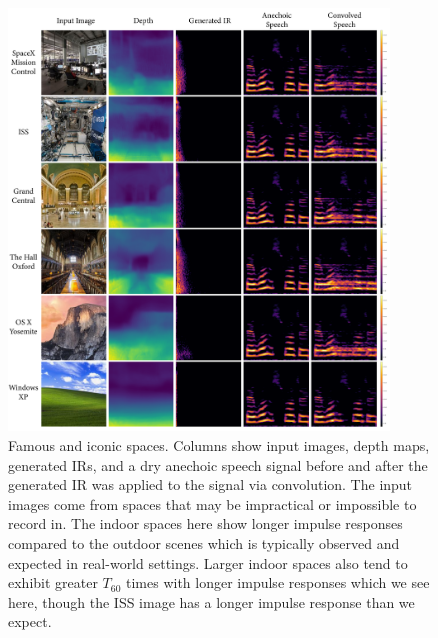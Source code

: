\begin{figure}[!hb]
    \centering
    \includegraphics[width=0.9\textwidth]{p_famous.png}
    \caption{Famous and iconic spaces. Columns show input images, depth maps, generated IRs, and a dry anechoic speech signal before and after the generated IR was applied to the signal via convolution. The input images come from spaces that may be impractical or impossible to record in. The indoor spaces here show longer impulse responses compared to the outdoor scenes which is typically observed and expected in real-world settings. Larger indoor spaces also tend to exhibit greater $T_{60}$ times with longer impulse responses which we see here, though the ISS image has a longer impulse response than we expect.}
    \label{fig:p_famous}
\end{figure}

